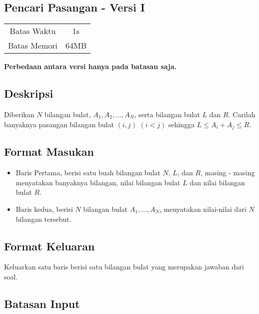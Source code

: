 \documentclass{article}
\begin{document}
\begin{center}
    \section*{Pencari Pasangan - Versi I} %

    \begin{tabular}{ | c c | }
        \hline
        Batas Waktu  & 1s \\    %
        Batas Memori & 64MB \\  %
        \hline
    \end{tabular}
\end{center}

\begin{center}
    \textbf{Perbedaan antara versi hanya pada batasan saja.}
\end{center}

\subsection*{Deskripsi}

Diberikan $N$ bilangan bulat, $A_1, A_2, \dots, A_N$, serta bilangan bulat $L$ dan $R$. Carilah banyaknya pasangan bilangan bulat $(i, j)$ $(i < j)$ sehingga $L \leq A_i + A_j \leq R$.

\subsection*{Format Masukan}
\begin{itemize}
\item{Baris Pertama, berisi satu buah bilangan bulat $N$, $L$, dan $R$, masing - masing menyatakan banyaknya bilangan, nilai bilangan bulat $L$ dan nilai bilangan bulat $R$.}

\item{Baris kedua, berisi $N$ bilangan bulat $A_1, \dots, A_N$, menyatakan nilai-nilai dari $N$ bilangan tersebut.}

\end{itemize}

\subsection*{Format Keluaran}
Keluarkan satu baris berisi satu bilangan bulat yang merupakan jawaban dari soal.

\subsection*{Batasan Input}
\end{document}
